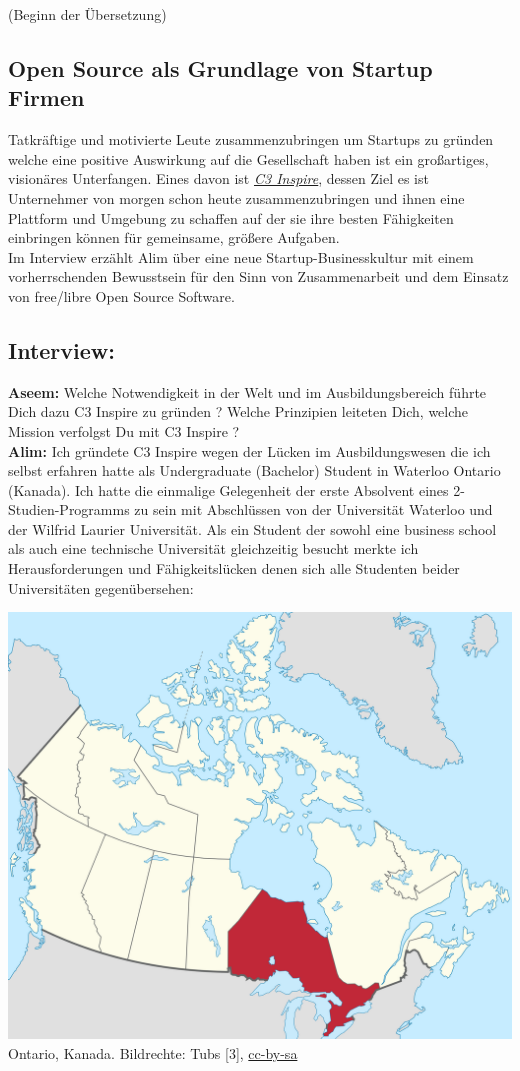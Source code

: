 (Beginn der Übersetzung)\\

\subsection*{Open Source als Grundlage von Startup Firmen}
Tatkräftige und motivierte Leute zusammenzubringen um Startups zu 
gründen welche eine positive Auswirkung auf die Gesellschaft haben ist 
ein großartiges, visionäres Unterfangen. Eines davon ist 
\href{http://c3inspire.com/about/}{\textit{C3 Inspire}}, 
dessen Ziel es ist Unternehmer von morgen schon heute 
zusammenzubringen und ihnen eine Plattform und Umgebung zu schaffen auf 
der sie ihre besten Fähigkeiten einbringen können für gemeinsame, 
größere Aufgaben. \\

Im Interview erzählt Alim über eine neue Startup-Businesskultur mit 
einem vorherrschenden Bewusstsein für den Sinn von Zusammenarbeit und 
dem Einsatz von free/libre Open Source Software.


\subsection*{Interview:} 
\textbf{Aseem:} Welche Notwendigkeit in der Welt und im Ausbildungsbereich 
führte Dich dazu C3 Inspire zu gründen ? Welche Prinzipien leiteten 
Dich, welche Mission verfolgst Du mit C3 Inspire ? 
\\ \textbf{Alim:} Ich gründete C3 Inspire wegen der Lücken im Ausbildungswesen die ich 
selbst erfahren hatte als Undergraduate (Bachelor) Student in Waterloo 
Ontario (Kanada).  Ich hatte die einmalige Gelegenheit der erste 
Absolvent eines 2-Studien-Programms zu sein mit Abschlüssen von der 
Universität Waterloo und der Wilfrid Laurier Universität. Als ein 
Student der sowohl eine business school als auch eine technische 
Universität gleichzeitig besucht merkte ich Herausforderungen und 
Fähigkeitslücken denen sich alle Studenten beider Universitäten 
gegenübersehen: 

\begin{center}
\includegraphics[width=0.7\linewidth]{c3inspire/c3inspire-ontario.png} \\
\footnotesize{Ontario, Kanada. Bildrechte: Tubs [3], \href{https://creativecommons.org/licenses/by-sa/2.5/deed.de}{cc-by-sa}}
\end{center}

